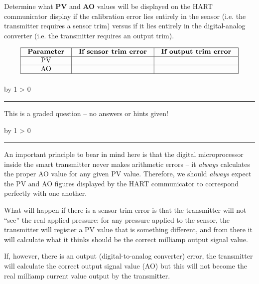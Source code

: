 \documentclass[12pt,a4paper]{article}
\def\svar{
           \advance\answnum by 1
           \ifnum \answnum > 0
                \hrule
                \vskip 3pt
                \leftline{Svar \the\answnum}
                \vskip 3pt \fi}
\def\notes{
           \advance\explnum by 1
           \ifnum \explnum > 0
                \hrule
                \vskip 3pt
                \leftline{Notes \the\explnum}
                \vskip 3pt \fi}
\begin{document}
Determine what {\bf PV} and {\bf AO} values will be displayed on the HART communicator display if the calibration error lies entirely in the sensor (i.e. the transmitter requires a sensor trim) versus if it lies entirely in the digital-analog converter (i.e. the transmitter requires an output trim).


$$\vbox{\offinterlineskip
\halign{\strut
\vrule \quad\hfil # \ \hfil & 
\vrule \quad\hfil # \ \hfil & 
\vrule \quad\hfil # \ \hfil \vrule \cr
\noalign{\hrule}
%
{\bf Parameter} & {\bf If sensor trim error} & {\bf If output trim error} \cr
%
\noalign{\hrule}
%
PV &  &  \cr
%
\noalign{\hrule}
%
AO &  &  \cr
%
\noalign{\hrule}
} %
}$$ %

\vfil 

\eject
\vskip 10pt \filbreak 





\svar{} 

This is a graded question -- no answers or hints given!

\vskip 10pt \filbreak 





\notes{} 


An important principle to bear in mind here is that the digital microprocessor inside the smart transmitter never makes arithmetic errors -- it {\it always} calculates the proper AO value for any given PV value.  Therefore, we should {\it always} expect the PV and AO figures displayed by the HART communicator to correspond perfectly with one another.

What will happen if there is a sensor trim error is that the transmitter will not ``see'' the real applied pressure: for any pressure applied to the sensor, the transmitter will register a PV value that is something different, and from there it will calculate what it thinks should be the correct milliamp output signal value.

If, however, there is an output (digital-to-analog converter) error, the transmitter will calculate the correct output signal value (AO) but this will not become the real milliamp current value output by the transmitter.
\end{document}
